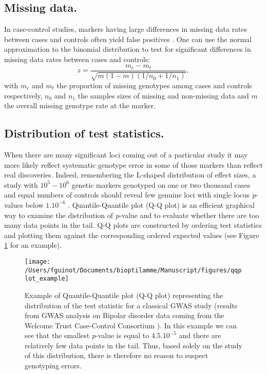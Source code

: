 \documentclass[]{book}
\begin{document}
\hypertarget{missing-data.}{%
\subsection{Missing data.}\label{missing-data.}}

In case-control studies, markers having large differences in missing
data rates between cases and controls often yield false positives
\citep{clayton2005population}. One can use the normal approximation to the
binomial distribution to test for significant differences in missing
data rates between cases and controls:
\[z = \frac{m_c - m_t}{\sqrt{m(1-m)(1/n_0+1/n_1)}},\] with \(m_c\) and
\(m_t\) the proportion of missing genotypes among cases and controls
respectively, \(n_0\) and \(n_1\) the samples sizes of missing and
non-missing data and \(m\) the overall missing genotype rate at the
marker.

\hypertarget{distribution-of-test-statistics.}{%
\subsection{Distribution of test statistics.}\label{distribution-of-test-statistics.}}

When there are many significant loci coming out of a particular study it
may more likely reflect systematic genotype error in some of those
markers than reflect real discoveries. Indeed, remembering the L-shaped
distribution of effect sizes, a study with \(10^5-10^6\) genetic markers
genotyped on one or two thousand cases and equal numbers of controls
should reveal few genuine loci with single locus \emph{p}-values below
\(1.10^{-6}\) \citep{zondervan2004complex}. Quantile-Quantile plot (Q-Q plot)
is an efficient graphical way to examine the distribution of \emph{p}-value
and to evaluate whether there are too many data points in the tail. Q-Q
plots are constructed by ordering test statistics and plotting them
against the corresponding ordered expected values (see Figure
\ref{fig:qqplot} for an example).



\begin{figure}

{\centering \texttt{[image: /Users/fguinot/Documents/bioptilamme/Manuscript/figures/qqplot\_example]} 

}

\caption{Example of Quantile-Quantile plot (Q-Q plot) representing the distribution of the test statistic for a classical GWAS study (results from GWAS analysis on Bipolar disorder data coming from the Welcome Trust Case-Control Consortium \citep{burton_genome-wide_2007}). In this example we can see that the smallest \emph{p}-value is equal to \(4.5.10^{-5}\) and there are relatively few data points in the tail. Thus, based solely on the study of this distribution, there is therefore no reason to suspect genotyping errors.}\label{fig:qqplot}
\end{figure}
\end{document}
